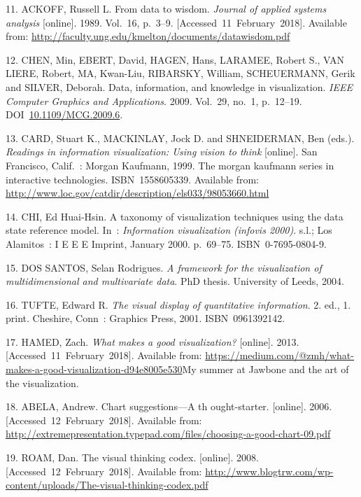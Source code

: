\documentclass[american,a4paper,oneside,,tablecaptionabove]{scrbook}
\begin{document}
\hypertarget{ref-Ackoff.1989}{}
11. ACKOFF, Russell L. From data to wisdom. \emph{Journal of applied
systems analysis} {[}online{]}. 1989. Vol.~16, p.~3--9.
{[}Accessed~11~February~2018{]}. Available from:
\url{http://faculty.ung.edu/kmelton/documents/datawisdom.pdf}

\hypertarget{ref-Chen.2009}{}
12. CHEN, Min, EBERT, David, HAGEN, Hans, LARAMEE, Robert S., VAN LIERE,
Robert, MA, Kwan-Liu, RIBARSKY, William, SCHEUERMANN, Gerik and SILVER,
Deborah. Data, information, and knowledge in visualization. \emph{IEEE
Computer Graphics and Applications}. 2009. Vol.~29, no.~1, p.~12--19.
DOI~\href{https://doi.org/10.1109/MCG.2009.6}{10.1109/MCG.2009.6}.

\hypertarget{ref-Shneiderman.1999}{}
13. CARD, Stuart K., MACKINLAY, Jock D. and SHNEIDERMAN, Ben (eds.).
\emph{Readings in information visualization: Using vision to think}
{[}online{]}. San Francisco, Calif.~: Morgan Kaufmann, 1999. The morgan
kaufmann series in interactive technologies. ISBN~1558605339. Available
from: \url{http://www.loc.gov/catdir/description/els033/98053660.html}

\hypertarget{ref-Chi.Jan.2000}{}
14. CHI, Ed Huai-Hsin. A taxonomy of visualization techniques using the
data state reference model. In~: \emph{Information visualization
(infovis 2000)}. s.l.; Los Alamitos~: I E E E Imprint, January 2000.
p.~69--75. ISBN~0-7695-0804-9.

\hypertarget{ref-DosSantos.2004}{}
15. DOS SANTOS, Selan Rodrigues. \emph{A framework for the visualization
of multidimensional and multivariate data}. PhD thesis. University of
Leeds, 2004.

\hypertarget{ref-Tufte.2001}{}
16. TUFTE, Edward R. \emph{The visual display of quantitative
information}. 2. ed., 1. print. Cheshire, Conn~: Graphics Press, 2001.
ISBN~0961392142.

\hypertarget{ref-Hamed.2013}{}
17. HAMED, Zach. \emph{What makes a good visualization?} {[}online{]}.
2013. {[}Accessed~11~February~2018{]}. Available from:
\url{https://medium.com/@zmh/what-makes-a-good-visualization-d94e8005e530}My
summer at Jawbone and the art of the visualization.

\hypertarget{ref-Abela.2006}{}
18. ABELA, Andrew. Chart suggestions---A th ought-starter. {[}online{]}.
2006. {[}Accessed~12~February~2018{]}. Available from:
\url{http://extremepresentation.typepad.com/files/choosing-a-good-chart-09.pdf}

\hypertarget{ref-Roam.2008}{}
19. ROAM, Dan. The visual thinking codex. {[}online{]}. 2008.
{[}Accessed~12~February~2018{]}. Available from:
\url{http://www.blogtrw.com/wp-content/uploads/The-visual-thinking-codex.pdf}
\end{document}
